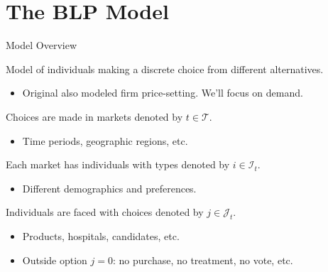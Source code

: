 \documentclass[aspectratio=169,t,11pt,table]{beamer}
\begin{document}
\section{The BLP Model}

\begin{frame}{Model Overview}
    \begin{wideitemize}
        \item Model of individuals making a discrete choice from different alternatives.
        \begin{itemize}
            \item Original also modeled firm price-setting. We'll focus on demand.
        \end{itemize}
        \pause
        \item Choices are made in \alert{markets} denoted by $t \in \mathcal{T}$.
        \begin{itemize}
            \item Time periods, geographic regions, etc.
        \end{itemize}
        \pause
        \item Each market has \alert{individuals} with types denoted by $i \in \mathcal{I}_t$.
        \begin{itemize}
            \item Different demographics and preferences.
        \end{itemize}
        \pause
        \item Individuals are faced with \alert{choices} denoted by $j \in \mathcal{J}_t$.
        \begin{itemize}
            \item Products, hospitals, candidates, etc.
            \item Outside option $j = 0$: no purchase, no treatment, no vote, etc.
        \end{itemize}
    \end{wideitemize}
\end{frame}
\end{document}
